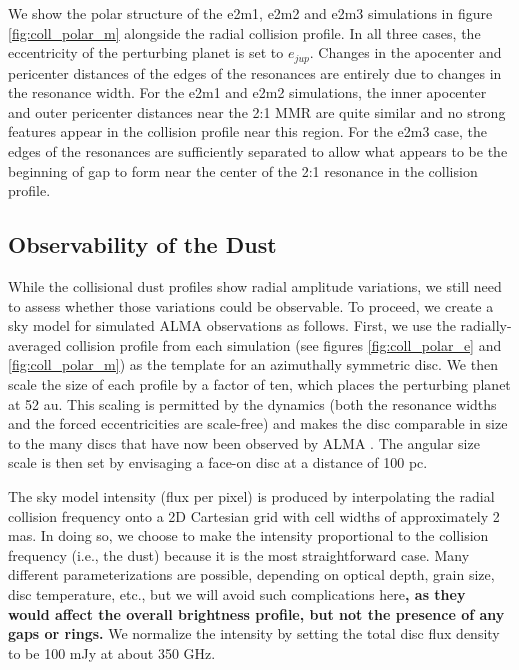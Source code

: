 \documentclass[fleqn,usenatbib]{mnras}
\begin{document}
We show the polar structure of the e2m1, e2m2 and e2m3 simulations in figure \ref{fig:coll_polar_m} alongside the radial collision profile. In all three 
cases, the eccentricity of the perturbing planet is set to $e_{jup}$. Changes in the apocenter and pericenter distances of the edges of the 
resonances are entirely due to changes in the resonance width. For the e2m1 and e2m2 simulations, the inner apocenter and outer pericenter 
distances near the 2:1 MMR are quite similar and no strong features appear in the collision profile near this region. For the e2m3 case, the edges of
the resonances are sufficiently separated to allow what appears to be the beginning of gap to form near the center of the 2:1 resonance in the collision profile.

\subsection{Observability of the Dust}

While the collisional dust profiles show radial amplitude variations, we still need to assess whether those variations could be observable. To proceed, 
we create a sky model for simulated ALMA observations as follows. First, we use the radially-averaged collision profile from each simulation (see figures 
\ref{fig:coll_polar_e} and \ref{fig:coll_polar_m}) as the template for an azimuthally symmetric disc. We then scale the size of each profile by a factor of 
ten, which places the perturbing planet at 52 au. This scaling is permitted by the dynamics (both the resonance widths and the forced eccentricities 
are scale-free) and makes the disc comparable in size to the many discs that have now been observed by ALMA \citep{2018ApJ...869L..42H}. The 
angular size scale is then set by envisaging a face-on disc at a distance of 100 pc.  

The sky model intensity (flux per pixel) is produced by interpolating the radial collision frequency onto a 2D Cartesian grid with cell widths of 
approximately 2 mas. In doing so, we choose to make the intensity proportional to the collision frequency (i.e., the dust) because it is the most 
straightforward case. Many different parameterizations are possible, depending on optical depth, grain size, disc temperature, etc., but we will avoid 
such complications here\textbf{, as they would affect the overall brightness profile, but not the presence of any gaps or rings.} We normalize the intensity by
setting the total disc flux density to be 100 mJy at about 350 GHz.  
\end{document}
